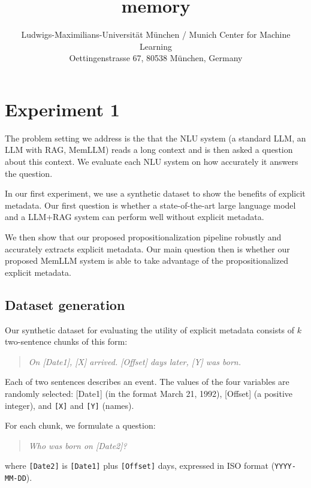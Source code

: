 \documentclass[11pt]{article}
\title{memory}
\author{  Ludwigs-Maximilians-Universität München / Munich Center for Machine Learning\\
  Oettingenstrasse 67, 80538 München, Germany \\
}
\begin{document}
\maketitle
\begin{abstract}

\end{abstract}



\section{Experiment 1}
The problem setting we address is the that the NLU system
(a standard LLM, an LLM with RAG, MemLLM) reads a long
context and is then asked a question about this context. We
evaluate each NLU system on how accurately it answers the question.


In our first experiment, we use a synthetic dataset to show
the benefits of explicit metadata.
Our first question is whether a state-of-the-art large
language model and a LLM+RAG system can perform well without explicit metadata.

We then show that our proposed propositionalization pipeline
robustly and accurately extracts explicit metadata.  Our
main question then is whether our proposed MemLLM system is
able to take advantage of the propositionalized explicit
metadata.



\subsection{Dataset generation}
Our synthetic dataset for evaluating the utility of explicit
metadata consists of $k$ two-sentence chunks of this form:

\begin{quote}
\emph{On [Date1], [X] arrived. [Offset] days later, [Y] was born.}
\end{quote}

Each of two sentences describes an event.
The values of the four variables are randomly selected:
[Date1] (in the format March 21, 1992), [Offset]
(a positive integer), and
\texttt{[X]} and \texttt{[Y]} (names).

For each chunk, we formulate a question:
\begin{quote}
\emph{Who was born on [Date2]?}
\end{quote}
where \texttt{[Date2]} is \texttt{[Date1]}
plus \texttt{[Offset]} days, expressed in ISO format
(\texttt{YYYY-MM-DD}).
\end{document}
